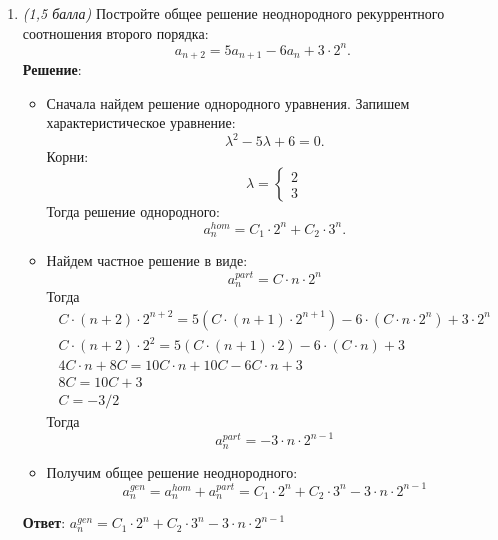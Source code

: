 \documentclass{article}
\begin{document}
\begin{enumerate}
    \item \textit{(1,5 балла)} Постройте общее решение неоднородного рекуррентного соотношения второго порядка:
    $$a_{n+2} = 5a_{n+1} - 6a_n + 3 \cdot 2^n.$$
    \textbf{Решение}:
    \begin{itemize}
      \item Сначала найдем решение однородного уравнения. Запишем характеристическое уравнение:
      \begin{equation}
        \lambda^2 - 5\lambda + 6 = 0.
      \end{equation}
      Корни:
      \begin{equation}
        \lambda = \begin{cases}
          2 \\
          3
        \end{cases}
      \end{equation}
      Тогда решение однородного:
      \begin{equation}
        a_n^{hom} = C_1 \cdot 2^n + C_2 \cdot 3^n.
      \end{equation}
      \item Найдем частное решение в виде:
      \begin{equation}
        a_n^{part} = C \cdot n \cdot 2^n
      \end{equation}
      Тогда
      \begin{eqnarray}
        C \cdot (n+2) \cdot 2^{n+2} = 5(C \cdot (n+1) \cdot 2^{n+1}) - 6\cdot (C \cdot n \cdot 2^n) + 3 \cdot 2^n \\
        C \cdot (n+2) \cdot 2^{2} = 5(C \cdot (n+1) \cdot 2) - 6\cdot (C \cdot n) + 3 \\
        4C \cdot n + 8C = 10C \cdot n + 10C - 6C \cdot n + 3 \\
        8C = 10C + 3 \\
        C = -3/2
      \end{eqnarray}
      Тогда
      \begin{equation}
        a_n^{part} = -3 \cdot n \cdot 2^{n-1}
      \end{equation}
      \item Получим общее решение неоднородного:
      \begin{equation}
        a_n^{gen} = a_n^{hom} + a_n^{part} = C_1 \cdot 2^n + C_2 \cdot 3^n - 3 \cdot n \cdot 2^{n-1}
      \end{equation}
    \end{itemize}

    \textbf{Ответ}:
    $a_n^{gen} = C_1 \cdot 2^n + C_2 \cdot 3^n - 3 \cdot n \cdot 2^{n-1}$

  \end{enumerate}
\end{document}
